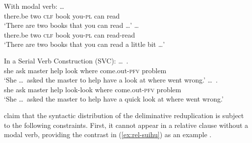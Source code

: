 \begin{sloppypar}
\ex With modal verb:
		\ea \gll {}       \ldots\\
		there.be two \textsc{clf} book you-\textsc{pl} can read\\
		\glt `There are two books that you can read \ldots'
		\ex \gll {}       \ldots\\
		there.be two \textsc{clf} book you-\textsc{pl} can read-read\\ 
		\glt `There are two books that you can read a little bit \ldots'
		\z

\ex\label{ex:syn-svc} In a Serial Verb Construction (SVC):
		\ea \gll {} \ldots\,       .\\
		she {}  ask master help look where come.out-\textsc{pfv} problem\\
		\glt `She \ldots\, asked the master to help have a look at where went wrong.'
		\ex \gll {} \ldots\,       .\\
		she {} ask master help look-look where come.out-\textsc{pfv} problem\\ 
		\glt `She \ldots\, asked the master to help have a quick look at where went wrong.'
		\z
\z

\end{sloppypar}

\citet{SuiHu2016} claim that the syntactic distribution of the deliminative reduplication is subject to the following constraints.
First, it cannot appear in a relative clause without a modal verb, providing the contrast in (\ref{ex:rel-suihu}) as an example \citep[319]{SuiHu2016}.
\ea\label{ex:rel-suihu}


